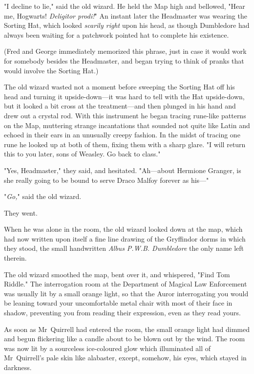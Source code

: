 "I decline to lie," said the old wizard. He held the Map high and bellowed,
"Hear me, Hogwarts! \emph{Deligitor prodi!}" An instant later the Headmaster
was wearing the Sorting Hat, which looked \emph{scarily right} upon his head,
as though Dumbledore had always been waiting for a patchwork pointed hat to
complete his existence.

(Fred and George immediately memorized this phrase, just in case it would work
for somebody besides the Headmaster, and began trying to think of pranks that
would involve the Sorting Hat.)

The old wizard wasted not a moment before sweeping the Sorting Hat off his head
and turning it upside-down—it was hard to tell with the Hat upside-down, but
it looked a bit cross at the treatment—and then plunged in his hand and drew
out a crystal rod. With this instrument he began tracing rune-like patterns on
the Map, muttering strange incantations that sounded not quite like Latin and
echoed in their ears in an unusually creepy fashion. In the midst of tracing
one rune he looked up at both of them, fixing them with a sharp glare. "I will
return this to you later, sons of Weasley. Go back to class."

"Yes, Headmaster," they said, and hesitated. "Ah—about Hermione Granger, is
she really going to be bound to serve Draco Malfoy forever as his—"

"\emph{Go,}" said the old wizard.

They went.

When he was alone in the room, the old wizard looked down at the map, which had
now written upon itself a fine line drawing of the Gryffindor dorms in which
they stood, the small handwritten \emph{Albus P.W.B. Dumbledore} the only name
left therein.

The old wizard smoothed the map, bent over it, and whispered, "Find Tom Riddle."
\later
The interrogation room at the Department of Magical Law Enforcement was usually
lit by a small orange light, so that the Auror interrogating you would be
leaning toward your uncomfortable metal chair with most of their face in
shadow, preventing you from reading their expression, even as they read yours.

As soon as Mr~Quirrell had entered the room, the small orange light had dimmed
and begun flickering like a candle about to be blown out by the wind. The room
was now lit by a sourceless ice-coloured glow which illuminated all of
Mr~Quirrell's pale skin like alabaster, except, somehow, his eyes, which
stayed in darkness.

